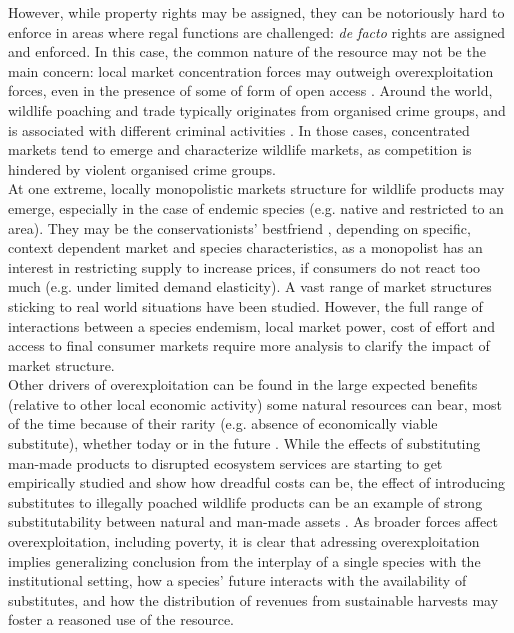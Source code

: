 	
	 However, while property rights may be assigned, they can be notoriously hard to enforce in areas where regal functions are challenged: \textit{de facto} rights are assigned and enforced. In this case, the common nature of the resource may not be the main concern: local market concentration forces may outweigh overexploitation forces, even in the presence of some of form of open access \citep{damania_economics_2007}. 
Around the world, wildlife poaching and trade typically originates from organised crime groups, and is associated with different criminal activities \citep{mozer_introduction_2023}.  In those cases, concentrated markets tend to emerge and characterize wildlife markets, as competition is hindered by violent organised crime groups. \\
	At one extreme, locally monopolistic markets structure for wildlife products may emerge, especially in the case of endemic species (e.g. native and restricted to an area).
They may be the conservationists' bestfriend \citep{solow_resources_1974, hannesson_note_1983}, depending on specific, context dependent market and species characteristics, as a monopolist has an interest in restricting supply to increase prices, if consumers do not react too much (e.g. under limited demand elasticity). A vast range of  market structures \citep{damania_economics_2007, hannesson_effects_1985} sticking to real world situations have been studied. However, the full range of interactions between a species endemism, local market power, cost of effort and access to final consumer markets require more analysis to clarify the impact of market structure.\\
	Other drivers of overexploitation can be found in the large expected benefits (relative to other local economic activity) some natural resources can bear, most of the time because of their rarity (e.g. absence of economically viable substitute), whether today or in the future \citep{Kremer2000}. While the effects of substituting man-made products to disrupted ecosystem services are starting to get empirically studied \citep{frank_economic_2024} and show how dreadful costs can be, the effect of introducing substitutes to illegally poached wildlife products can be an example of strong substitutability between natural and man-made assets \citep{chen_economics_2017}. As broader forces affect overexploitation, including poverty, it is clear that adressing overexploitation implies generalizing conclusion from the interplay of a single species with the institutional setting, how a  species' future interacts with the availability of substitutes, and how the distribution of revenues from sustainable harvests may foster a reasoned use of the resource. 
	
